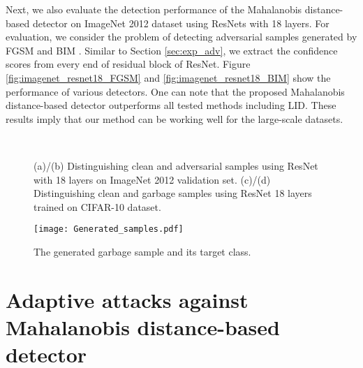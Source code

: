 \documentclass{article}
\newcommand{\cutcaptionup}{\vspace*{-0.1in}}
\newcommand{\cutcaptiondown}{\vspace*{-0.15in}}
\newcommand{\cutcaptionup}{}
\newcommand{\cutcaptiondown}{}
\begin{document}
Next, we also evaluate the detection performance of the Mahalanobis distance-based detector on ImageNet 2012 dataset using ResNets with 18 layers.
For evaluation, we consider the problem of detecting adversarial samples generated by FGSM \citep{goodfellow2014explaining} and BIM \citep{kurakin2016adversarial}. 
Similar to Section \ref{sec:exp_adv}, 
we extract the confidence scores from every end of residual block of ResNet. Figure \ref{fig:imagenet_resnet18_FGSM} and \ref{fig:imagenet_resnet18_BIM} show the performance of various detectors.
One can note that the proposed Mahalanobis distance-based detector outperforms all tested methods including LID. 
These results imply that our method can be working well for the large-scale datasets. 



\begin{figure} [t] \centering
\vspace{-0.1in}
\,
\,
\,
\cutcaptionup
\caption{(a)/(b) Distinguishing clean and adversarial samples using ResNet with 18 layers on ImageNet 2012 validation set. (c)/(d) Distinguishing clean and garbage samples using ResNet 18 layers trained on CIFAR-10 dataset.}
\cutcaptiondown
\vspace{+0.05in}
\label{fig:imagenet_resnet18}
\end{figure}



\begin{figure*} [t] \centering
  \texttt{[image: Generated\_samples.pdf]} 
\caption{The generated garbage sample and its target class.}
\label{fig:garbage}
\end{figure*}

\section{Adaptive attacks against Mahalanobis distance-based detector}
\end{document}
